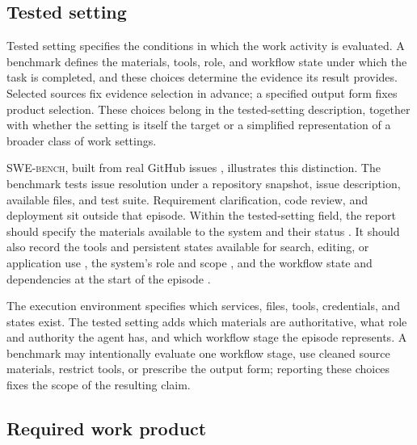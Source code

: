 \documentclass[10pt]{article}
\begin{document}
\subsection{Tested setting}
\label{sec:tested-setting}

Tested setting specifies the conditions in which the work activity is evaluated. A benchmark defines the materials, tools, role, and workflow state under which the task is completed, and these choices determine the evidence its result provides. Selected sources fix evidence selection in advance; a specified output form fixes product selection. These choices belong in the tested-setting description, together with whether the setting is itself the target or a simplified representation of a broader class of work settings.

\textsc{SWE-bench}, built from real GitHub issues \citep{jimenez2024swebench}, illustrates this distinction. The benchmark tests issue resolution under a repository snapshot, issue description, available files, and test suite. Requirement clarification, code review, and deployment sit outside that episode. Within the tested-setting field, the report should specify the materials available to the system and their status \citep{suchman1987plans,carlile2002pragmatic}. It should also record the tools and persistent states available for search, editing, or application use \citep{zhou2023webarena,xie2024osworld,drouin2024workarena}, the system's role and scope \citep{abbott1988system,freidson2001professionalism}, and the workflow state and dependencies at the start of the episode \citep{carlile2004transferring,malone1994coordination}.

The execution environment specifies which services, files, tools, credentials, and states exist. The tested setting adds which materials are authoritative, what role and authority the agent has, and which workflow stage the episode represents. A benchmark may intentionally evaluate one workflow stage, use cleaned source materials, restrict tools, or prescribe the output form; reporting these choices fixes the scope of the resulting claim.

\subsection{Required work product}
\label{sec:score-work-product}
\end{document}
